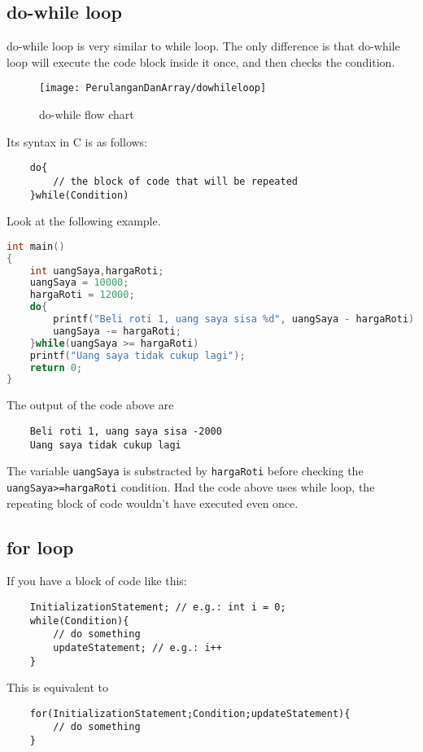 \subsection{do-while loop}
do-while loop is very similar to while loop. The only difference is that do-while loop will execute the code block inside it once, and then checks the condition.
\begin{figure}[H]
		\centering
		\texttt{[image: PerulanganDanArray/dowhileloop]}
		\caption{do-while flow chart}
		\label{fig:dowhileloop}
\end{figure}
Its syntax in C is as follows:
\begin{verbatim}
    do{
        // the block of code that will be repeated
    }while(Condition)
\end{verbatim}
Look at the following example.
\begin{lstlisting}[language=c,caption = Contoh Penggunaan do-while,label=lst:dowhileexample01]
int main()
{
	int uangSaya,hargaRoti;
	uangSaya = 10000;
	hargaRoti = 12000;
	do{
	    printf("Beli roti 1, uang saya sisa %d", uangSaya - hargaRoti);
	    uangSaya -= hargaRoti;
	}while(uangSaya >= hargaRoti)
	printf("Uang saya tidak cukup lagi");
	return 0;
}
\end{lstlisting}  
The output of the code above are
\begin{verbatim}
    Beli roti 1, uang saya sisa -2000
    Uang saya tidak cukup lagi
\end{verbatim}
The variable \verb|uangSaya| is substracted by \verb|hargaRoti| before checking the \verb|uangSaya>=hargaRoti| condition.
Had the code above uses while loop, the repeating block of code wouldn't have executed even once.

\subsection{for loop}
If you have a block of code like this:
\begin{verbatim}
    InitializationStatement; // e.g.: int i = 0;
    while(Condition){
        // do something
        updateStatement; // e.g.: i++ 
    }
\end{verbatim}
This is equivalent to
\begin{verbatim}
    for(InitializationStatement;Condition;updateStatement){
        // do something
    }
\end{verbatim}


